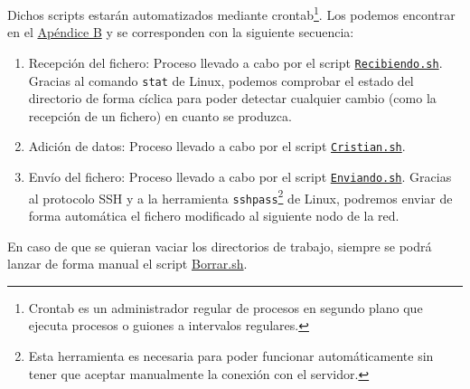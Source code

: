 Dichos scripts estarán automatizados mediante crontab\footnote{Crontab es un administrador regular de procesos en segundo plano que ejecuta procesos o guiones a intervalos regulares.}. Los podemos encontrar en el \hyperlink{Scripts}{Apéndice B} y se corresponden con la siguiente secuencia:
\begin{enumerate}
	\item Recepción del fichero: Proceso llevado a cabo por el script \hyperlink{ScriptRecibiendo}{\texttt{Recibiendo.sh}}. Gracias al comando \texttt{stat} de Linux, podemos comprobar el estado del directorio de forma cíclica para poder detectar cualquier cambio (como la recepción de un fichero) en cuanto se produzca.
	\item Adición de datos: Proceso llevado a cabo por el script \hyperlink{ScriptCristian}{\texttt{Cristian.sh}}.
	\item Envío del fichero: Proceso llevado a cabo por el script \hyperlink{ScriptEnviando}{\texttt{Enviando.sh}}. Gracias al protocolo SSH y a la herramienta \texttt{sshpass}\footnote{Esta herramienta es necesaria para poder funcionar automáticamente sin tener que aceptar manualmente la conexión con el servidor.} de Linux, podremos enviar de forma automática el fichero modificado al siguiente nodo de la red.
\end{enumerate}

En caso de que se quieran vaciar los directorios de trabajo, siempre se podrá lanzar de forma manual el script \hyperlink{ScriptBorrar}{Borrar.sh}.
